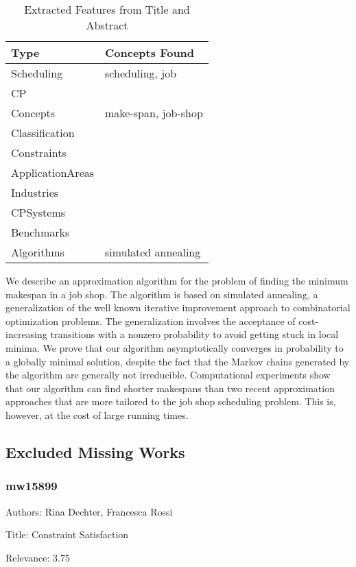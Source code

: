 {\scriptsize
\begin{longtable}{p{2cm}p{20cm}}
\caption{Extracted Features from Title and Abstract}\\ \toprule
Type & Concepts Found\\ \midrule
\endhead
\bottomrule
\endfoot
Scheduling & scheduling, job\\ 
CP & \\ 
Concepts & make-span, job-shop\\ 
Classification & \\ 
Constraints & \\ 
ApplicationAreas & \\ 
Industries & \\ 
CPSystems & \\ 
Benchmarks & \\ 
Algorithms & simulated annealing\\ 
\end{longtable}
}

  We describe an approximation algorithm for the problem of finding the minimum makespan in a job shop. The algorithm is based on simulated annealing, a generalization of the well known iterative improvement approach to combinatorial optimization problems. The generalization involves the acceptance of cost-increasing transitions with a nonzero probability to avoid getting stuck in local minima. We prove that our algorithm asymptotically converges in probability to a globally minimal solution, despite the fact that the Markov chains generated by the algorithm are generally not irreducible. Computational experiments show that our algorithm can find shorter makespans than two recent approximation approaches that are more tailored to the job shop scheduling problem. This is, however, at the cost of large running times.  

\subsection{Excluded Missing Works}

\subsubsection{mw15899}
\label{mw:mw15899}

Authors: Rina Dechter, Francesca Rossi

Title: Constraint Satisfaction

Relevance:  3.75

